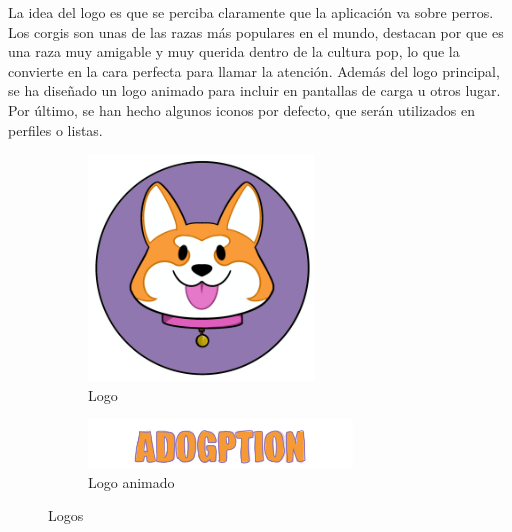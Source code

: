 \documentclass[a4paper, 12pt]{article}
\begin{document}
La idea del logo es que se perciba claramente que la aplicación va sobre perros. Los corgis son unas de las razas más populares en el mundo, destacan por que es una raza muy amigable y muy querida dentro de la cultura pop, lo que la convierte en la cara perfecta para llamar la atención. Además del logo principal, se ha diseñado un logo animado para incluir en pantallas de carga u otros lugar. Por último, se han hecho algunos iconos por defecto, que serán utilizados en perfiles o listas.


\begin{figure}[H]
   	\begin{subfigure}{0.48\textwidth}
		\begin{center}
			{\includegraphics[width=6cm]{logo/Logo1.png}\par}
			\caption{Logo}
		\end{center}  
	\end{subfigure}\hfill
   	\begin{subfigure}{0.48\textwidth}
		\begin{center}
			{\includegraphics[width=7cm]{logo/ADOGPTIONFIXED.png}\par}
			\caption{Logo animado}
		\end{center}  
	\end{subfigure}\hfill
	\caption{Logos}
\end{figure}
\end{document}
